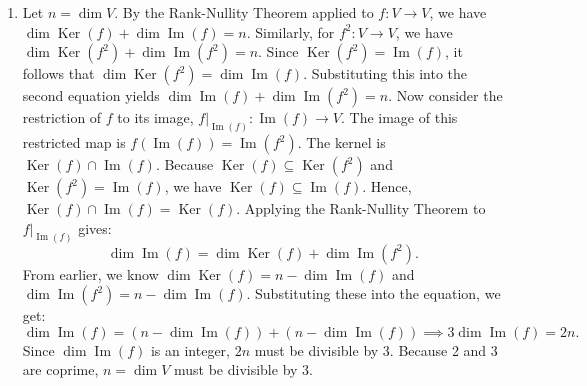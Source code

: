\documentclass{article}
\begin{document}
\begin{enumerate}[label=\fbox{\arabic*}]
        \[
          A + I = \begin{pmatrix} 3 & 1 & 1 \\ -30 & 2 & 2 \\ 45 & 3 & 3 \end{pmatrix} \sim \begin{pmatrix} 3 & 1 & 1 \\ 0 & 12 & 12 \\ 0 & -12 & -12 \end{pmatrix}.
        \]
        The rank is $2$, so the geometric multiplicity is $1 \neq 2$. Thus, $A$ is not diagonalizable for $a = 15$.
        Therefore, $A$ is diagonalizable over $\mathbb{R}$ if and only if $a \in (-1, 15) \cup (15, \infty)$.

  \item %
        Let $n = \dim V$. By the Rank-Nullity Theorem applied to $f : V \to V$, we have $\dim \operatorname{Ker}(f) + \dim \operatorname{Im}(f) = n$.
        Similarly, for $f^2 : V \to V$, we have $\dim \operatorname{Ker}(f^2) + \dim \operatorname{Im}(f^2) = n$.
        Since $\operatorname{Ker}(f^2) = \operatorname{Im}(f)$, it follows that $\dim \operatorname{Ker}(f^2) = \dim \operatorname{Im}(f)$.
        Substituting this into the second equation yields $\dim \operatorname{Im}(f) + \dim \operatorname{Im}(f^2) = n$.
        Now consider the restriction of $f$ to its image, $f|_{\operatorname{Im}(f)} : \operatorname{Im}(f) \to V$.
        The image of this restricted map is $f(\operatorname{Im}(f)) = \operatorname{Im}(f^2)$.
        The kernel is $\operatorname{Ker}(f) \cap \operatorname{Im}(f)$. Because $\operatorname{Ker}(f) \subseteq \operatorname{Ker}(f^2)$ and $\operatorname{Ker}(f^2) = \operatorname{Im}(f)$, we have $\operatorname{Ker}(f) \subseteq \operatorname{Im}(f)$. Hence, $\operatorname{Ker}(f) \cap \operatorname{Im}(f) = \operatorname{Ker}(f)$.
        Applying the Rank-Nullity Theorem to $f|_{\operatorname{Im}(f)}$ gives:
        \[
          \dim \operatorname{Im}(f) = \dim \operatorname{Ker}(f) + \dim \operatorname{Im}(f^2).
        \]
        From earlier, we know $\dim \operatorname{Ker}(f) = n - \dim \operatorname{Im}(f)$ and $\dim \operatorname{Im}(f^2) = n - \dim \operatorname{Im}(f)$.
        Substituting these into the equation, we get:
        \[
          \dim \operatorname{Im}(f) = (n - \dim \operatorname{Im}(f)) + (n - \dim \operatorname{Im}(f)) \implies 3 \dim \operatorname{Im}(f) = 2n.
        \]
        Since $\dim \operatorname{Im}(f)$ is an integer, $2n$ must be divisible by 3. Because 2 and 3 are coprime, $n = \dim V$ must be divisible by 3.


\end{enumerate}
\end{document}
